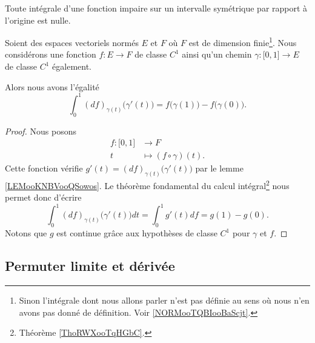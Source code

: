 \begin{remark}
  Toute intégrale d'une fonction impaire sur un intervalle symétrique par rapport à l'origine est nulle.
\end{remark}

\begin{proposition}      \label{PROPooJYIAooXLkbMx}
    Soient des espaces vectoriels normés \( E\) et \( F\) où \( F\) est de dimension finie\footnote{Sinon l'intégrale dont nous allons parler n'est pas définie au sens où nous n'en avons pas donné de définition. Voir \ref{NORMooTQBIooBaScjt}.}. Nous considérons une fonction \( f\colon E\to F\) de classe \( C^1\) ainsi qu'un chemin \( \gamma\colon \mathopen[ 0 , 1 \mathclose]\to E\) de classe \( C^1\) également.

    Alors nous avons l'égalité
    \begin{equation}
        \int_0^1(df)_{\gamma(t)}\big( \gamma'(t) \big)=f\big( \gamma(1) \big)-f\big( \gamma(0) \big).
    \end{equation}
\end{proposition}

\begin{proof}
    Nous posons
    \begin{equation}
        \begin{aligned}
            f\colon \mathopen[ 0 , 1 \mathclose]&\to F \\
            t&\mapsto (f\circ\gamma)(t). 
        \end{aligned}
    \end{equation}
    Cette fonction vérifie \( g'(t)=(df)_{\gamma(t)}\big( \gamma'(t) \big)\) par le lemme \ref{LEMooKNBVooQSowos}. Le théorème fondamental du calcul intégral\footnote{Théorème \ref{ThoRWXooTqHGbC}.} nous permet donc d'écrire
    \begin{equation}
        \int_0^1(df)_{\gamma(t)}\big( \gamma'(t) \big)dt=\int_0^1g'(t)df=g(1)-g(0).
    \end{equation}
    Notons que \( g\) est continue grâce aux hypothèses de classe \( C^1\) pour \( \gamma\) et \( f\).
\end{proof}

\subsection{Permuter limite et dérivée}

